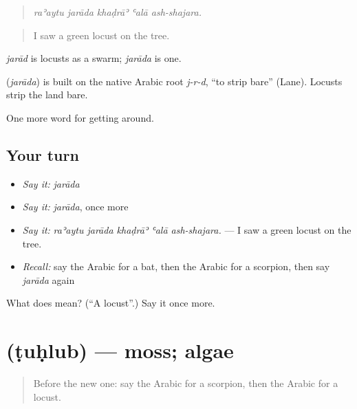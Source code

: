 \begin{quote}
\emph{raʾaytu jarāda khaḍrāʾ ʿalā ash-shajara.}
\end{quote}

\begin{quote}
I saw a green locust on the tree.
\end{quote}

\emph{jarād} is locusts as a swarm; \emph{jarāda} is one.

\begin{cousinweb}
\textbf{} (\emph{jarāda}) is built on the native Arabic root \emph{j-r-d}, \textquotedblleft{}to strip bare\textquotedblright{} (Lane). Locusts strip the land bare.
\end{cousinweb}

\begin{grammarlens}[title={What you've built}]
One more word for getting around.
\end{grammarlens}

\subsection*{Your turn}
\begin{itemize}
\raggedright
  \item \emph{Say it:} \emph{jarāda}
  \item \emph{Say it:} \emph{jarāda}, once more
  \item \emph{Say it:} \emph{raʾaytu jarāda khaḍrāʾ ʿalā ash-shajara.} — I saw a green locust on the tree.
  \item \emph{Recall:} say the Arabic for a bat, then the Arabic for a scorpion, then say \emph{jarāda} again
\end{itemize}

\begin{tcolorbox}[breakable,colback=teal!4,colframe=teal!35!black,title={Before you move on}]
What does  mean? (\textquotedblleft{}A locust\textquotedblright{}.) Say it once more.
\end{tcolorbox}
\section[\texorpdfstring{\ar{طحلب} (ṭuḥlub)}{طحلب (ṭuḥlub)}]{ (ṭuḥlub) — moss; algae}

\label{lesson:AR-C476-tuhlub}



\begin{quote}
Before the new one: say the Arabic for a scorpion, then the Arabic for a locust.
\end{quote}

